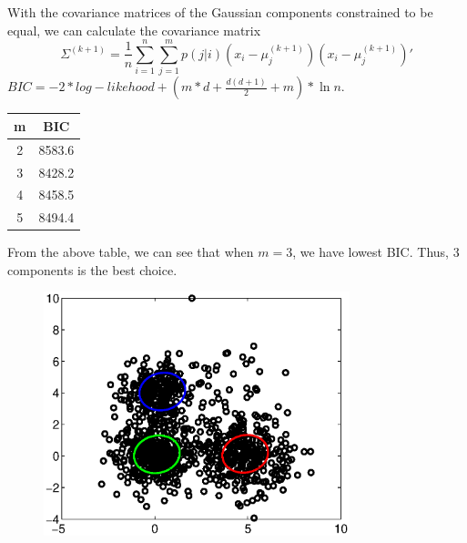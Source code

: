 \documentclass{article}
\theoremstyle{definition}
\theoremstyle{definition}
\theoremstyle{remark}
\begin{document}
\begin{itemize}
With the covariance matrices of the Gaussian components constrained to be equal, we can calculate the covariance matrix
\[
\Sigma^{(k+1)}=\frac{1}{n}\sum_{i=1}^n\sum_{j=1}^m p(j|i)(x_i-\mu_j^{(k+1)})(x_i-\mu_j^{(k+1)})'\]
$BIC = -2*log-likehood + (m*d+\frac{d(d+1)}{2}+m)*\ln n$.\\
\begin{table}[!htp]
\centering
\begin{tabular}{|c|c|}
\hline
 m & BIC \\
\hline
2 & 8583.6 \\
\hline
3 & 8428.2 \\
\hline
4 & 8458.5 \\
\hline
5 & 8494.4 \\
\hline
\end{tabular}
\end{table}
From the above table, we can see that when $m=3$, we have lowest BIC. Thus, 3 components is the best choice.
\begin{figure}[!htbp]
  \centering
  \includegraphics[width=3.5in]{2.eps}\\
\end{figure}
\end{itemize}


\end{document}
